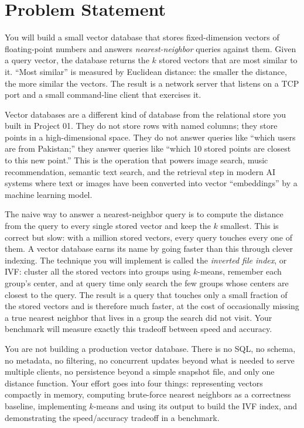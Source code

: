 \documentclass[11pt,a4paper]{article}
\begin{document}

\section{Problem Statement}

You will build a small vector database that stores fixed-dimension vectors of floating-point numbers and answers \textit{nearest-neighbor} queries against them. Given a query vector, the database returns the $k$ stored vectors that are most similar to it. ``Most similar'' is measured by Euclidean distance: the smaller the distance, the more similar the vectors. The result is a network server that listens on a TCP port and a small command-line client that exercises it.

Vector databases are a different kind of database from the relational store you built in Project 01. They do not store rows with named columns; they store points in a high-dimensional space. They do not answer queries like ``which users are from Pakistan;'' they answer queries like ``which 10 stored points are closest to this new point.'' This is the operation that powers image search, music recommendation, semantic text search, and the retrieval step in modern AI systems where text or images have been converted into vector ``embeddings'' by a machine learning model.

The naive way to answer a nearest-neighbor query is to compute the distance from the query to every single stored vector and keep the $k$ smallest. This is correct but slow: with a million stored vectors, every query touches every one of them. A vector database earns its name by going faster than this through clever indexing. The technique you will implement is called the \textit{inverted file index}, or IVF: cluster all the stored vectors into groups using $k$-means, remember each group's center, and at query time only search the few groups whose centers are closest to the query. The result is a query that touches only a small fraction of the stored vectors and is therefore much faster, at the cost of occasionally missing a true nearest neighbor that lives in a group the search did not visit. Your benchmark will measure exactly this tradeoff between speed and accuracy.

You are not building a production vector database. There is no SQL, no schema, no metadata, no filtering, no concurrent updates beyond what is needed to serve multiple clients, no persistence beyond a simple snapshot file, and only one distance function. Your effort goes into four things: representing vectors compactly in memory, computing brute-force nearest neighbors as a correctness baseline, implementing $k$-means and using its output to build the IVF index, and demonstrating the speed/accuracy tradeoff in a benchmark.
\end{document}
